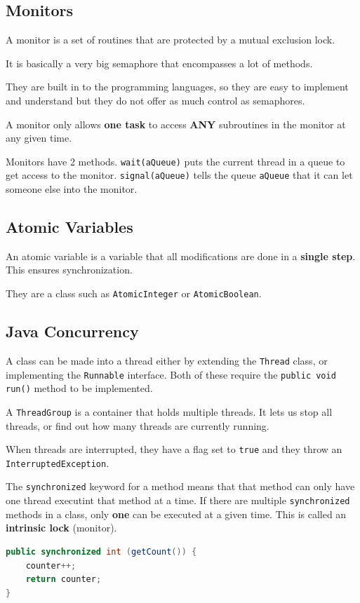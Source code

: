 \documentclass[12pt,letterpaper]{article} \usepackage{amsmath} \usepackage{graphicx} \usepackage[margin=1in]{geometry} \usepackage{longtable}  \usepackage{amssymb}
\begin{document}
	\subsection{Monitors}
	A monitor is a set of routines that are protected by a mutual exclusion lock. 
	
	It is basically a very big semaphore that encompasses a lot of methods. 
	
	They are built in to the programming languages, so they are easy to implement and understand but they do not offer as much control as semaphores. 
	
	A monitor only allows \textbf{one task} to access \textbf{ANY} subroutines in the monitor at any given time. 
	
	Monitors have 2 methods. \verb*|wait(aQueue)| puts the current thread in a queue to get access to the monitor. \verb*|signal(aQueue)| tells the queue \verb*|aQueue| that it can let someone else into the monitor. 
	
	\subsection{Atomic Variables}
	An atomic variable is a variable that all modifications are done in a \textbf{single step}. This ensures synchronization. 
	
	They are a class such as \verb*|AtomicInteger| or \verb*|AtomicBoolean|.
	
	\subsection{Java Concurrency}
	A class can be made into a thread either by extending the \verb*|Thread| class, or implementing the \verb*|Runnable| interface. Both of these require the \verb*|public void run()| method to be implemented.
	
	A \verb*|ThreadGroup| is a container that holds multiple threads. It lets us stop all threads, or find out how many threads are currently running. 
	
	When threads are interrupted, they have a flag set to \verb*|true| and they throw an \verb*|InterruptedException|. 
	
	The \verb*|synchronized| keyword for a method means that that method can only have one thread executint that method at a time. If there are multiple \verb*|synchronized| methods in a class, only \textbf{one} can be executed at a given time. This is called an \textbf{intrinsic lock} (monitor).
	\begin{lstlisting}[language=java]
public synchronized int (getCount()) {
	counter++;
	return counter;
}
	\end{lstlisting}
	
\end{document}
